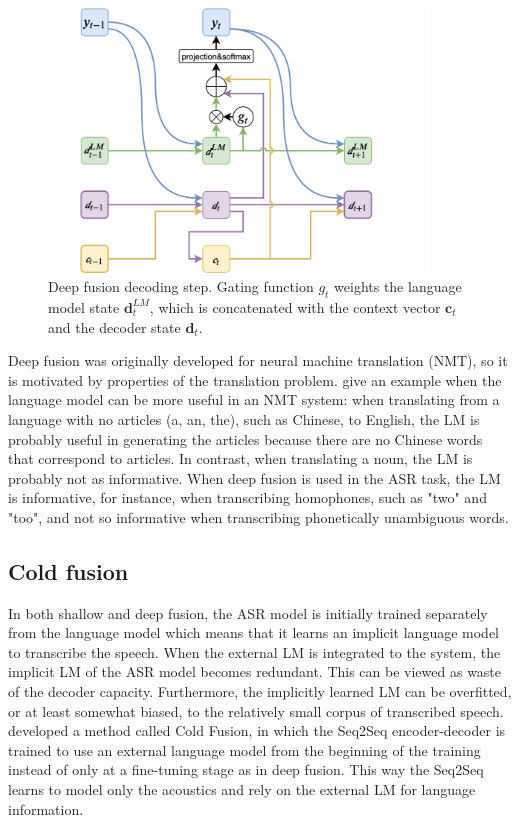 \documentclass[11pt]{article}
\begin{document}
\begin{figure}[htb]
    \begin{center}
        \includegraphics[height=7cm]{deepfusion.png}
    \end{center}
    \caption{Deep fusion decoding step. Gating function $g_t$ weights the language model state $\boldsymbol{d}_t^{LM}$, which is concatenated with the context vector $\boldsymbol c_t$ and the decoder state $\boldsymbol{d}_t$.}
    \label{deepfusion}
\end{figure}

Deep fusion was originally developed for neural machine translation (NMT), so it is motivated by properties of the translation problem. \citet{gulcehre2015using} give an example when the language model can be more useful in an NMT system: when translating from a language with no articles (a, an, the), such as Chinese, to English, the LM is probably useful in generating the articles because there are no Chinese words that correspond to articles. In contrast, when translating a noun, the LM is probably not as informative. When deep fusion is used in the ASR task, the LM is informative, for instance, when transcribing homophones, such as "two" and "too", and not so informative when transcribing phonetically unambiguous words.



\subsection{Cold fusion}

In both shallow and deep fusion, the ASR model is initially trained separately from the language model which means that it learns an implicit language model to transcribe the speech. When the external LM is integrated to the system, the implicit LM of the ASR model becomes redundant.
This can be viewed as waste of the decoder capacity. Furthermore, the implicitly learned LM can be overfitted, or at least somewhat biased, to the relatively small corpus of transcribed speech. \citet{sriram2017cold} developed a method called Cold Fusion, in which the Seq2Seq encoder-decoder is trained to use an external language model from the beginning of the training instead of only at a fine-tuning stage as in deep fusion. This way the Seq2Seq learns to model only the acoustics and rely on the external LM for language information.
\end{document}
